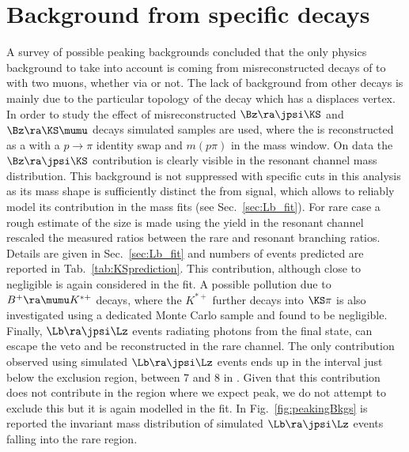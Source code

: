 \section{Background from specific decays}

A survey of possible peaking backgrounds concluded that the only physics background
to take into account is coming from misreconstructed decays of \Bz to \KS with
two muons, whether via \jpsi or not. The lack of background from other decays is
mainly due to the particular topology of the \Lz decay which has a displaces vertex.
In order to study the effect of misreconstructed $\Bz\ra\jpsi\KS$ and $\Bz\ra\KS\mumu$ decays
simulated samples are used, where the \KS is reconstructed as a \Lz with a $p\rightarrow \pi$ identity
swap and $m(p\pi)$ in the \Lz mass window.
On data the $\Bz\ra\jpsi\KS$ contribution is clearly visible in the resonant channel mass distribution.
This background is not suppressed with specific cuts in this analysis as its mass shape is sufficiently distinct
the from \Lb signal, which allows to reliably model its contribution in the mass fits (see Sec.~\ref{sec:Lb_fit}).
For rare case a rough estimate of the size is made using the yield in the resonant channel
rescaled the measured ratios between the rare and resonant branching ratios. 
Details are given in Sec.~\ref{sec:Lb_fit} and numbers of events predicted are reported in Tab.~\ref{tab:KSprediction}.
This contribution, although close to negligible is again considered in the fit.
A possible pollution due to $B^{+} \ra\mumu K^{*+}$ decays, where the $K^{*+}$
further decays into $\KS\pi$ is also investigated using a dedicated Monte Carlo sample and found to be negligible.
Finally, $\Lb\ra\jpsi\Lz$ events radiating photons from the final state, can escape the \jpsi veto
and be reconstructed in the rare channel. The only contribution observed using simulated $\Lb\ra\jpsi\Lz$ events ends up
in the interval just below the \jpsi exclusion region, between 7 and 8 \gevcc in \qsq.
Given that this contribution does not contribute in the region where we expect \Lb peak, we do
not attempt to exclude this but it is again modelled in the fit.
In Fig.~\ref{fig:peakingBkgs} is reported the invariant mass distribution of simulated $\Lb\ra\jpsi\Lz$
events falling into the rare \qsq region.
                          

